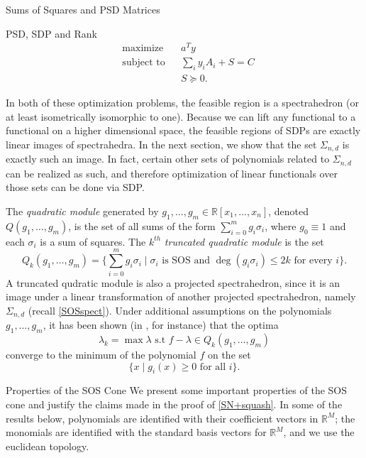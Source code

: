 \documentclass[12pt,oneside,final]{ucthesisucsbmath2010}
\newcommand{\R}{\mathbb{R}}
\newcommand{\snd}{\Sigma_{n,d}}
\newcommand{\pn}{\R[x_1,\ldots,x_n]}
\theoremstyle{definition}
\begin{document}
\begin{chapter}{Sums of Squares and PSD Matrices}
\begin{section}{PSD, SDP and Rank}
\begin{equation*}
\begin{aligned}
& \text{maximize}
& & a^Ty \\
& \text{subject to}
& & \sum_i y_iA_i +S = C\\
&&& S \succeq 0.
\end{aligned}
\end{equation*}

In both of these optimization problems, the feasible region is a spectrahedron (or at least isometrically isomorphic to one). Because we can lift any functional to a functional on a higher dimensional space, the feasible regions of SDPs are exactly linear images of spectrahedra. In the next section, we show that the set $\snd$ is exactly such an image. In fact, certain other sets of polynomials related to $\snd$ can be realized as such, and therefore optimization of linear functionals over those sets can be done via SDP.

The \emph{quadratic module} generated by $g_1,\ldots,g_m \in \pn$, denoted $Q(g_1,\ldots,g_m)$, is the set of all sums of the form $\sum_{i=0}^m g_i\sigma_i$, where $g_0 \equiv 1$ and each $\sigma_i$ is a sum of squares. The $k^{th}$ \emph{truncated quadratic module} is the set 
\[Q_k(g_1,\ldots,g_m) = \Big\{\sum_{i=0}^m g_i\sigma_i \mid \sigma_i \text{ is SOS and } \deg(g_i\sigma_i) \leq 2k \text{ for every } i\Big\}.\]
A truncated qudratic module is also a projected spectrahedron, since it is an image under a linear transformation of another projected spectrahedron, namely $\snd$ (recall \ref{SOSspect}). Under additional assumptions on the polynomials $g_1,\ldots,g_m$, it has been shown (in \cite{Lass1}, for instance) that the optima \[\lambda_k = \max \lambda \text{ s.t } f-\lambda \in Q_k(g_1,\ldots,g_m)\] converge to the minimum of the polynomial $f$ on the set \[\{x \mid g_i(x) \geq 0 \text{ for all }i\}.\]

\end{section}

\begin{section}{Properties of the SOS Cone}
We present some important properties of the SOS cone and justify the claims made in the proof of \ref{SN+squash}. In some of the results below, polynomials are identified with their coefficient vectors in $\R^M$; the monomials are identified with the standard basis vectors for $\R^M$, and we use the euclidean topology.


\end{section}
\end{chapter}
\end{document}
